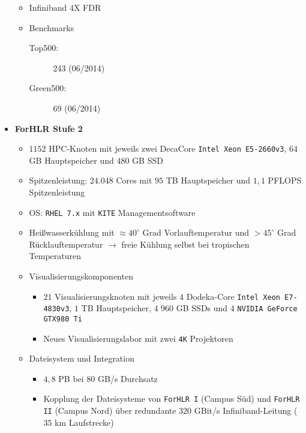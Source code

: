 \begin{itemize}
\begin{itemize}
		\item Infiniband 4X FDR
		\item Benchmarks
		\begin{description}
			\item[Top500:] 243 (06/2014)
			\item[Green500:] 69 (06/2014)
		\end{description}
	\end{itemize}
	\item \textbf{ForHLR Stufe 2}
	\begin{itemize}
		\item \(1152\) HPC-Knoten mit jeweils zwei DecaCore \texttt{Intel Xeon E5-2660v3}, \(64\) GB Hauptspeicher und \(480\) GB SSD
		\item Spitzenleistung: \(24.048\) Cores mit \(95\) TB Hauptspeicher und \(1,1\) PFLOPS Spitzenleistung
		\item OS: \texttt{RHEL 7.x} mit \texttt{KITE} Managementsoftware
		\item Heißwasserkühlung mit \(\approx 40^\circ\) Grad Vorlauftemperatur und \(> 45^\circ\) Grad Rücklauftemperatur \(\rightarrow\) freie Kühlung selbst bei tropischen Temperaturen
		\item Visualisierungskomponenten
		\begin{itemize}
			\item \(21\) Visualisierungsknoten mit jeweils \(4\) Dodeka-Core \texttt{Intel Xeon E7-4830v3}, \(1\) TB Hauptspeicher, \(4\) \(960\) GB SSDs und \(4\) \texttt{NVIDIA GeForce GTX980 Ti}
			\item Neues Visualisierungslabor mit zwei \texttt{4K} Projektoren
		\end{itemize}
		\item Dateisystem und Integration
		\begin{itemize}
			\item \(4,8\) PB bei \(80\) GB/s Durchsatz
			\item Kopplung der Dateisysteme von \texttt{ForHLR I} (Campus Süd) und \texttt{ForHLR II} (Campus Nord) über redundante \(320\) GBit/s Infiniband-Leitung (\(35\) km Laufstrecke)
		\end{itemize}
	\end{itemize}
\end{itemize}


